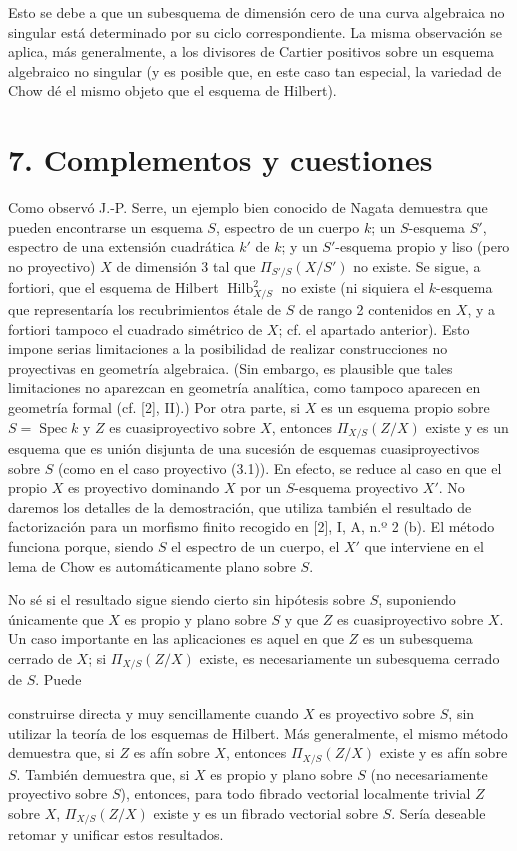 \documentclass[11pt,twoside,openany]{book}
\numberwithin{equation}{section}
\newcommand{\src}[1]{%
  \phantomsection\hypertarget{src:#1}{}%
  \marginpar{\raggedleft\footnotesize\sffamily #1}%
}
\theoremstyle{plain}
\theoremstyle{definition}
\theoremstyle{remark}
\newcommand{\fsection}[2]{%
  \section*{#1. #2}%
  \addcontentsline{toc}{section}{#1. #2}%
}
\newcommand{\FgaUnitKey}{frontmatter}
\renewcommand{\src}[1]{%
  \phantomsection\hypertarget{src:\FgaUnitKey:#1}{}%
  \marginpar{\raggedleft\footnotesize\sffamily #1}%
}
\theoremstyle{plain}
\theoremstyle{definition}
\theoremstyle{remark}
\begin{document}
Esto se debe a que un subesquema de dimensión cero de una curva algebraica no
singular está determinado por su ciclo correspondiente. La misma observación
se aplica, más generalmente, a los divisores de Cartier positivos sobre un
esquema algebraico no singular (y es posible que, en este caso tan especial,
la variedad de Chow dé el mismo objeto que el esquema de Hilbert).

\fsection{7}{Complementos y cuestiones}

Como observó J.-P. Serre, un ejemplo bien conocido de Nagata demuestra que
pueden encontrarse un esquema $S$, espectro de un cuerpo $k$; un $S$-esquema
$S'$, espectro de una extensión cuadrática $k'$ de $k$; y un $S'$-esquema
propio y liso (pero no proyectivo) $X$ de dimensión 3 tal que
$\Pi_{S'/S}(X/S')$ no existe. Se sigue, a fortiori, que el esquema de
Hilbert $\operatorname{Hilb}^2_{X/S}$ no existe (ni siquiera el $k$-esquema
que representaría los recubrimientos étale de $S$ de rango 2 contenidos en
$X$, y a fortiori tampoco el cuadrado simétrico de $X$; cf. el apartado
anterior). Esto impone serias limitaciones a la posibilidad de realizar
construcciones no proyectivas en geometría algebraica. (Sin embargo, es
plausible que tales limitaciones no aparezcan en geometría analítica, como
tampoco aparecen en geometría formal (cf. [2], II).) Por otra parte, si $X$ es
un esquema propio sobre $S=\operatorname{Spec}k$ y $Z$ es cuasiproyectivo
sobre $X$, entonces $\Pi_{X/S}(Z/X)$ existe y es un esquema que es unión
disjunta de una sucesión de esquemas cuasiproyectivos sobre $S$ (como en el
caso proyectivo (3.1)). En efecto, se reduce al caso en que el propio $X$ es
proyectivo dominando $X$ por un $S$-esquema proyectivo $X'$. No daremos los
detalles de la demostración, que utiliza también el resultado de factorización
para un morfismo finito recogido en [2], I, A, n.º 2 (b). El método funciona
porque, siendo $S$ el espectro de un cuerpo, el $X'$ que interviene en el lema
de Chow es automáticamente plano sobre $S$.

No sé si el resultado sigue siendo cierto sin hipótesis sobre $S$, suponiendo
únicamente que $X$ es propio y plano sobre $S$ y que $Z$ es cuasiproyectivo
sobre $X$. Un caso importante en las aplicaciones es aquel en que $Z$ es un
subesquema cerrado de $X$; si $\Pi_{X/S}(Z/X)$ existe, es necesariamente un
subesquema cerrado de $S$. Puede
\src{276}
construirse directa y muy sencillamente cuando $X$ es proyectivo sobre $S$,
sin utilizar la teoría de los esquemas de Hilbert. Más generalmente, el mismo
método demuestra que, si $Z$ es afín sobre $X$, entonces $\Pi_{X/S}(Z/X)$
existe y es afín sobre $S$. También demuestra que, si $X$ es propio y plano
sobre $S$ (no necesariamente proyectivo sobre $S$), entonces, para todo
fibrado vectorial localmente trivial $Z$ sobre $X$, $\Pi_{X/S}(Z/X)$ existe y
es un fibrado vectorial sobre $S$. Sería deseable retomar y unificar estos
resultados.
\end{document}
